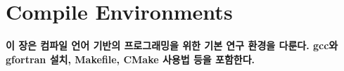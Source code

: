 
\graphicspath{{./chap4/images/}}  
\chapter{Compile Environments}

\textbf{이 장은 컴파일 언어 기반의 프로그래밍을 위한 기본 연구 환경을 다룬다. gcc와 gfortran 설치, Makefile, CMake 사용법 등을 포함한다.}

